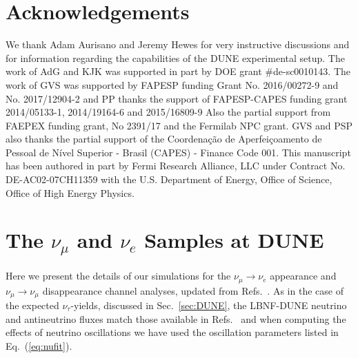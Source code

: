 \documentclass[aps,prd,onecolumn,nofootinbib,superscriptaddress, 11pt]{revtex4}
\begin{document}
\section*{Acknowledgements}
We thank Adam Aurisano and Jeremy Hewes for very instructive discussions and for information regarding the capabilities of the DUNE experimental setup. 
The work of AdG and KJK was supported in part by DOE grant \#de-sc0010143. The work of GVS was supported by FAPESP funding Grant  No. 2016/00272-9 and No. 2017/12904-2 and PP thanks the support of FAPESP-CAPES funding
grant 2014/05133-1, 2014/19164-6 and 2015/16809-9 Also the partial support from FAEPEX funding grant, No 2391/17 and the Fermilab NPC grant. GVS and PSP also thanks the partial support of the Coordena\c{c}\~ao de Aperfei\c{c}oamento de Pessoal de N\'ivel Superior - Brasil (CAPES) - Finance Code 001. This manuscript has been authored in part by Fermi Research Alliance, LLC under Contract No. DE-AC02-07CH11359 with the U.S. Department of Energy, Office of Science, Office of High Energy Physics.

\appendix

\section{The $\nu_{\mu}$ and $\nu_e$ Samples at DUNE}
\label{appendix:others}

Here we present the details of our simulations for the $\nu_\mu \to \nu_e$ appearance and $\nu_\mu \to \nu_\mu$ disappearance channel analyses, updated from Refs.~\cite{Berryman:2015nua,deGouvea:2015ndi,Berryman:2016szd,deGouvea:2016pom,deGouvea:2017yvn}. As in the case of the expected $\nu_{\tau}$-yields, discussed in Sec.~\ref{sec:DUNE}, the LBNF-DUNE neutrino and antineutrino fluxes match those available in Refs.~\cite{LauraFlux,Acciarri:2015uup} and when computing the effects of neutrino oscillations we have used the oscillation parameters listed in Eq.~(\ref{eq:nufit}).
\end{document}
